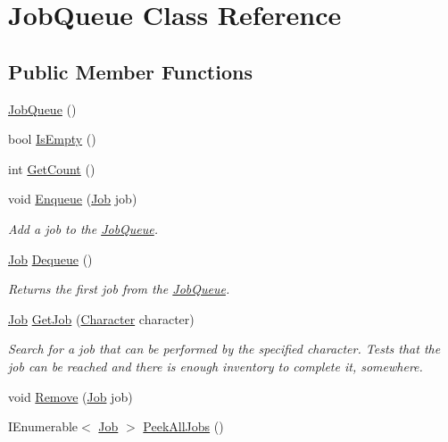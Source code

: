 \hypertarget{class_job_queue}{}\section{Job\+Queue Class Reference}
\label{class_job_queue}
\subsection*{Public Member Functions}
\begin{DoxyCompactItemize}
\item 
\hyperlink{class_job_queue_a289d49dff9c2c49656dd589bd64c3aa6}{Job\+Queue} ()
\item 
bool \hyperlink{class_job_queue_ab88494452f5c6b0115d5fe5b452fa8eb}{Is\+Empty} ()
\item 
int \hyperlink{class_job_queue_ad9731c29b4830c04c1dd2f8f76cfd122}{Get\+Count} ()
\item 
void \hyperlink{class_job_queue_a1ad28f817250ffe648245c2ec76d1aa1}{Enqueue} (\hyperlink{class_job}{Job} job)
\begin{DoxyCompactList}\small\item\em Add a job to the \hyperlink{class_job_queue}{Job\+Queue}. \end{DoxyCompactList}\item 
\hyperlink{class_job}{Job} \hyperlink{class_job_queue_a4c09bd98140e27617b5b80c7f9c5fd13}{Dequeue} ()
\begin{DoxyCompactList}\small\item\em Returns the first job from the \hyperlink{class_job_queue}{Job\+Queue}. \end{DoxyCompactList}\item 
\hyperlink{class_job}{Job} \hyperlink{class_job_queue_a22dd1f2d2bfdffc2b9cf8540c547f12b}{Get\+Job} (\hyperlink{class_project_porcupine_1_1_entities_1_1_character}{Character} character)
\begin{DoxyCompactList}\small\item\em Search for a job that can be performed by the specified character. Tests that the job can be reached and there is enough inventory to complete it, somewhere. \end{DoxyCompactList}\item 
void \hyperlink{class_job_queue_aa81b1e92c067b91b41c8a612e9e7985d}{Remove} (\hyperlink{class_job}{Job} job)
\item 
I\+Enumerable$<$ \hyperlink{class_job}{Job} $>$ \hyperlink{class_job_queue_a233a410811f3f747f0fb62b59650cf25}{Peek\+All\+Jobs} ()

\end{DoxyCompactItemize}
